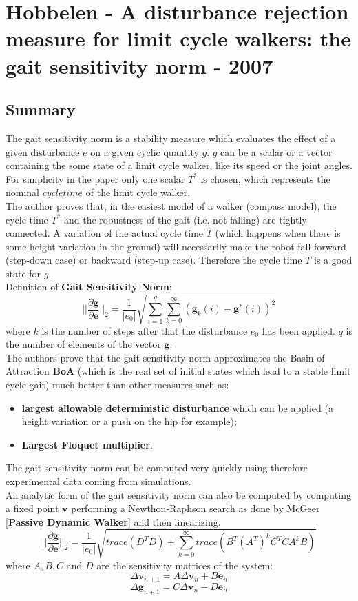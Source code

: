 \section{Hobbelen - A disturbance rejection measure for limit cycle walkers: the gait sensitivity norm - 2007}

\subsection*{Summary}
The gait sensitivity norm is a stability measure which evaluates the effect of a given disturbance $e$ on a given cyclic quantity $g$. $g$ can be a scalar or a vector containing the some state of a limit cycle walker, like its speed or the joint angles. For simplicity in the paper only one scalar $T^*$ is chosen, which represents the nominal $cycle time$ of the limit cycle walker.\\
The author proves that, in the easiest model of a walker (compass model), the cycle time $T^*$ and the robustness of the gait (i.e. not falling) are tightly connected. A variation of the actual cycle time  $T$ (which happens when there is some height variation in the ground) will necessarily make the robot fall forward (step-down case) or backward (step-up case). Therefore the cycle time $T$ is a good state for $g$.\\
Definition of \textbf{Gait Sensitivity Norm}:
$$  ||\frac{\partial \mathbf{g}}{\partial \mathbf{e}}||_2 = \frac{1}{|e_0|} \sqrt{\sum_{i=1}^q \sum_{k=0}^\infty (\mathbf{g}_k(i) - \mathbf{g^*}(i))^2}$$
where $k$ is the number of steps after that the disturbance $e_0$ has been applied. $q$ is the number of elements of the vector $\mathbf{g}$.\\
The authors prove that the gait sensitivity norm approximates the Basin of Attraction \textbf{BoA} (which is the real set of initial states which lead to a stable limit cycle gait) much better than other measures such as:
\begin{itemize}
\item \textbf{largest allowable deterministic disturbance} which can be applied (a height variation or a push on the hip for example);
\item \textbf{Largest Floquet multiplier}.
\end{itemize}
The gait sensitivity norm can be computed very quickly using therefore experimental data coming from simulations.\\
An analytic form of the gait sensitivity norm can also be computed by computing a fixed point $\mathbf{v}$ performing a Newthon-Raphson search as done by McGeer [\textbf{Passive Dynamic Walker}] and then linearizing. 
$$  ||\frac{\partial \mathbf{g}}{\partial \mathbf{e}}||_2 = \frac{1}{|e_0|} \sqrt{trace(D^T D) + \sum_{k=0}^\infty trace(B^T (A^T)^k C^T C A^k B)} $$
where $A, B, C$ and $D$ are the sensitivity matrices of the system:
$$ \Delta \mathbf{v}_{n+1} = A \Delta \mathbf{v}_n +B \mathbf{e}_n$$
$$ \Delta \mathbf{g}_{n+1} = C \Delta \mathbf{v}_n +D \mathbf{e}_n$$